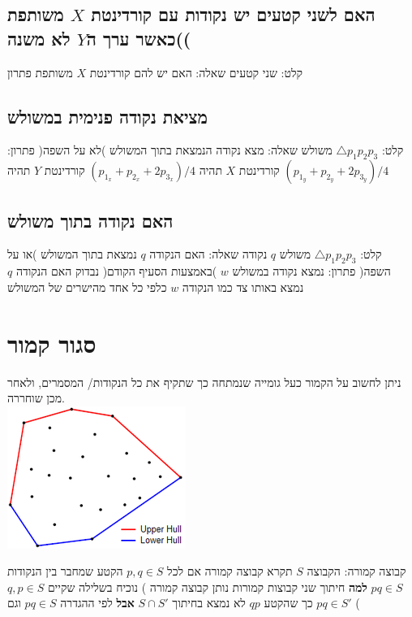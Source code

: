 \documentclass{article}
\makeatletter
\newcommand*{\saved@uline}{}
\let\saved@uline\uline
\newcommand*{\mathuline}{%
  \mathpalette{\math@uline\saved@uline}%
}
\newcommand*{\math@uline}[3]{%
  \mbox{#1{$#2#3\m@th$}}%
}
\renewcommand*{\uline}{%
  \relax  
  \ifmmode
    \expandafter\mathuline
  \else
    \expandafter\saved@uline
  \fi
}
\makeatother
\begin{document}
\subsection{האם לשני קטעים יש נקודות עם קורדינטת $X$ משותפת )כאשר ערך ה$Y$ לא משנה(}
\noindent \uline{קלט:} שני קטעים
\newline \uline{שאלה:} האם יש להם קורדינטת $X$ משותפת 
\newline\uline{פתרון}
\subsection{מציאת נקודה פנימית במשולש}
\noindent \uline{קלט:} $\triangle p_1p_2p_3$ משולש
\newline \uline{שאלה:} מצא נקודה הנמצאת בתוך המשולש )לא על השפה(
\newline \uline{פתרון:}  קורדינטת $X$ תהיה $(p_{1_x}+p_{2_x}+2p_{3_x})/4$ קורדינטת $Y$ תהיה $(p_{1_y}+p_{2_y}+2p_{3_y})/4$

\subsection{האם נקודה בתוך משולש}
\noindent \uline{קלט:} $\triangle p_1p_2p_3$ משולש $q$ נקודה
\newline \uline{שאלה:} האם הנקודה $q$ נמצאת בתוך המשולש )או על השפה(
\newline \uline{פתרון:} נמצא נקודה במשולש $w$ )באמצעות הסעיף הקודם( נבדוק האם הנקודה $q$ נמצא באותו צד כמו הנקודה $w$ כלפי כל אחד מהישרים של המשולש 

\section{ סגור קמור}
ניתן לחשוב על הקמור כעל גומייה שנמתחה כך שתקיף את כל הנקודות/ המסמרים, ולאחר מכן שוחררה.\\
\includegraphics[scale=0.7]{z1.png}

\noindent\uline{קבוצה קמורה:} הקבוצה $S$ תקרא קבוצה קמורה אם לכל $p,q\in S$ הקטע שמחבר בין הנקודות $pq\in S$
\newline\newline\textbf{למה} חיתוך שני קבוצות קמורות נותן קבוצה קמורה
) נוכיח בשלילה שקיים $q,p\in S$ כך שהקטע $qp$ לא נמצא בחיתוך $S\cap S'$ \textbf{אבל} לפי ההגדרה $pq \in S$ וגם $pq \in S'$ (
\end{document}
